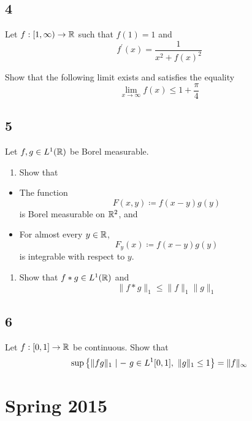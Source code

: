 \hypertarget{section-3}{%
\subsection{4}\label{section-3}}

Let \(f: [1, \infty) \to {\mathbb{R}}\) such that \(f(1) = 1\) and \[
f^{\prime}(x)= \frac{1} {x^{2}+f(x)^{2}}
\]

Show that the following limit exists and satisfies the equality \[
\lim _{x \rightarrow \infty} f(x) \leq 1 + \frac \pi 4
\]

\hypertarget{section-4}{%
\subsection{5}\label{section-4}}

Let \(f, g \in L^1({\mathbb{R}})\) be Borel measurable.

\begin{enumerate}
\def\labelenumi{\arabic{enumi}.}
\tightlist
\item
  Show that
\end{enumerate}

\begin{itemize}
\tightlist
\item
  The function \[F(x, y) \coloneqq f(x-y) g(y)\] is Borel measurable on
  \({\mathbb{R}}^2\), and
\item
  For almost every \(y\in {\mathbb{R}}\), \[F_y(x) \coloneqq f(x-y)g(y)\] is
  integrable with respect to \(y\).
\end{itemize}

\begin{enumerate}
\def\labelenumi{\arabic{enumi}.}
\setcounter{enumi}{1}
\tightlist
\item
  Show that \(f\ast g \in L^1({\mathbb{R}})\) and \[
  \|f * g\|_{1} \leq\|f\|_{1}\|g\|_{1}
  \]
\end{enumerate}

\hypertarget{section-5}{%
\subsection{6}\label{section-5}}

Let \(f: [0, 1] \to {\mathbb{R}}\) be continuous. Show that \[
\sup \left\{\|f g\|_{1} {~\mid- ~} g \in L^{1}[0,1],~~ \|g\|_{1} \leq 1\right\}=\|f\|_{\infty}
\]

\hypertarget{spring-2015}{%
\section{Spring 2015}\label{spring-2015}}

